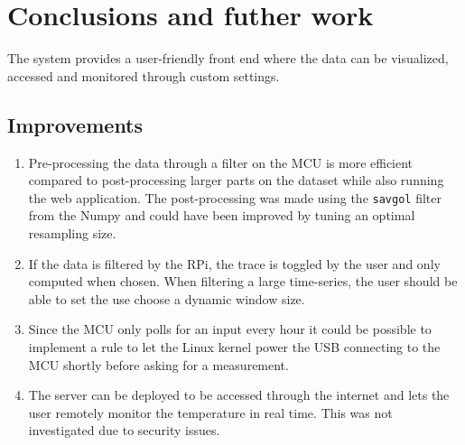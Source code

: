 \section{Conclusions and futher work}%
\label{sec:conclusions_and_futher_work}

The system provides a user-friendly front end where the data can be visualized, accessed and monitored through custom settings. 

\subsection{Improvements}%
\label{sub:improvements}

\begin{enumerate}
 \item Pre-processing the data through a filter on the MCU is more efficient compared to post-processing larger parts on the dataset while also running the web application. The post-processing was made using the \verb|savgol| filter from the Numpy and could have been improved by tuning an optimal resampling size. 
 \item If the data is filtered by the RPi, the trace is toggled by the user and only computed when chosen. When filtering a large time-series, the user should be able to set the use choose a dynamic window size.
 \item Since the MCU only polls for an input every hour it could be possible to implement a rule to let the Linux kernel power the USB connecting to the MCU shortly before asking for a measurement.
 \item The server can be deployed to be accessed through the internet and lets the user remotely monitor the temperature in real time. This was not investigated due to security issues.
\end{enumerate}
